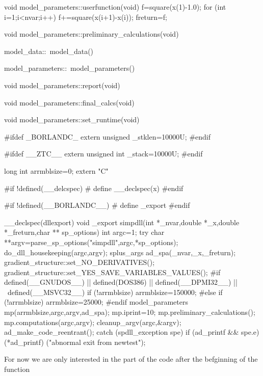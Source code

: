 void model_parameters::userfunction(void)
{
  f=square(x(1)-1.0);
  for (int i=1;i<nvar;i++)
  {
    f+=square(x(i+1)-x(i));
  }
  freturn=f;
}

void model_parameters::preliminary_calculations(void){}

model_data::~model_data()
{}

model_parameters::~model_parameters()
{}

void model_parameters::report(void){}

void model_parameters::final_calcs(void){}

void model_parameters::set_runtime(void){}

#ifdef _BORLANDC_
  extern unsigned _stklen=10000U;
#endif


#ifdef __ZTC__
  extern unsigned int _stack=10000U;
#endif

  long int arrmblsize=0;
extern "C" {

#if !defined(__delcspec)
#  define __declspec(x)
#endif

#if !defined(__BORLANDC__)
#  define _export
#endif

__declspec(dllexport) void _export simpdll(int *_nvar,double *_x,double *_freturn,char ** sp_options)
{
  int argc=1;
  try {
    char **argv=parse_sp_options("simpdll",argc,*sp_options);
    do_dll_housekeeping(argc,argv);
    splus_args ad_spa(_nvar,_x,_freturn);
    gradient_structure::set_NO_DERIVATIVES();
    gradient_structure::set_YES_SAVE_VARIABLES_VALUES();
  #if defined(__GNUDOS__) || defined(DOS386) || defined(__DPMI32__)  || \
     defined(__MSVC32__)
      if (!arrmblsize) arrmblsize=150000;
  #else
      if (!arrmblsize) arrmblsize=25000;
  #endif
    model_parameters mp(arrmblsize,argc,argv,ad_spa);
    mp.iprint=10;
    mp.preliminary_calculations();
    mp.computations(argc,argv);
    cleanup_argv(argc,&argv);
    ad_make_code_reentrant();
  }
  catch (spdll_exception spe){ 
    if (ad_printf && spe.e) (*ad_printf) ("abnormal exit from newtest\n");
  }
}
}
\endexample
\noindent For now we are only interested in the 
part of the code after the befginning of the function

